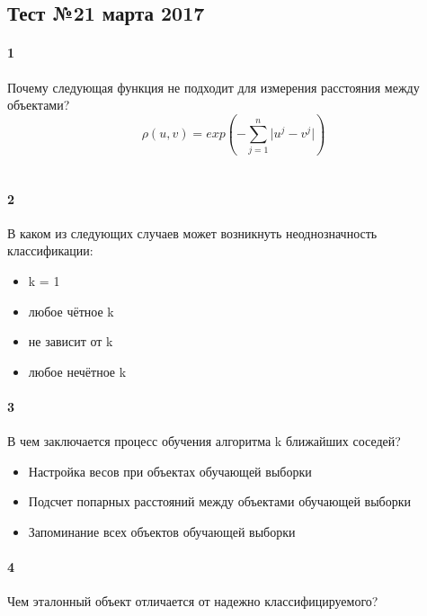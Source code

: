 \documentclass[a4paper,12pt]{article}
\begin{document}
  \subsection*{Тест №2\hfill{1 марта 2017}}

  \paragraph{1} Почему следующая функция не подходит для измерения расстояния между объектами?\\
  $$\rho(u, v) = exp(-\sum\limits_{j=1}^n \vert u^j - v^j \vert)$$\\
  \makebox[\linewidth]{\hrulefill}
  \makebox[\linewidth]{\hrulefill}
  
  \paragraph{2} В каком из следующих случаев может возникнуть неоднозначность классификации:
  \begin{itemize}
    \item k = 1
    \item любое чётное k
    \item не зависит от k
    \item любое нечётное k 
  \end{itemize}
  
  \paragraph{3} В чем заключается процесс обучения алгоритма k ближайших соседей?
  \begin{itemize}
    \item Настройка весов при объектах обучающей выборки
    \item Подсчет попарных расстояний между объектами обучающей выборки
    \item Запоминание всех объектов обучающей выборки
  \end{itemize}
  
  \paragraph{4} Чем эталонный объект отличается от надежно классифицируемого?\\
  
  \makebox[\linewidth]{\hrulefill}
  \makebox[\linewidth]{\hrulefill}
    
\end{document}
